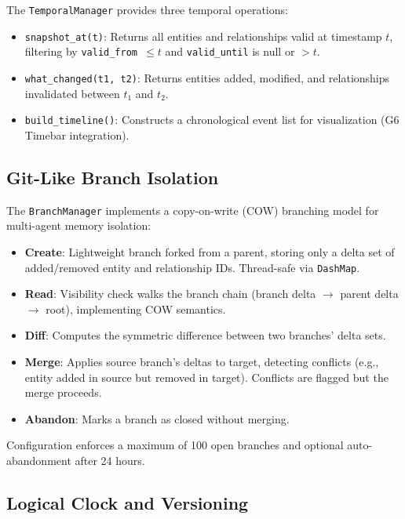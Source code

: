 \documentclass[11pt,a4paper,twocolumn]{article}
\begin{document}
The \texttt{TemporalManager} provides three temporal operations:
\begin{itemize}[leftmargin=*]
  \item \texttt{snapshot\_at(t)}: Returns all entities and relationships
    valid at timestamp $t$, filtering by \texttt{valid\_from $\leq t$}
    and \texttt{valid\_until} is null or $> t$.
  \item \texttt{what\_changed(t1, t2)}: Returns entities added,
    modified, and relationships invalidated between $t_1$ and $t_2$.
  \item \texttt{build\_timeline()}: Constructs a chronological event
    list for visualization (G6 Timebar integration).
\end{itemize}

\subsection{Git-Like Branch Isolation}

The \texttt{BranchManager} implements a copy-on-write (COW) branching
model for multi-agent memory isolation:

\begin{itemize}[leftmargin=*]
  \item \textbf{Create}: Lightweight branch forked from a parent,
    storing only a delta set of added/removed entity and relationship
    IDs. Thread-safe via \texttt{DashMap}.
  \item \textbf{Read}: Visibility check walks the branch chain
    (branch delta $\to$ parent delta $\to$ root), implementing
    COW semantics.
  \item \textbf{Diff}: Computes the symmetric difference between
    two branches' delta sets.
  \item \textbf{Merge}: Applies source branch's deltas to target,
    detecting conflicts (e.g., entity added in source but removed
    in target). Conflicts are flagged but the merge proceeds.
  \item \textbf{Abandon}: Marks a branch as closed without merging.
\end{itemize}

Configuration enforces a maximum of 100 open branches and optional
auto-abandonment after 24 hours.

\subsection{Logical Clock and Versioning}
\end{document}

